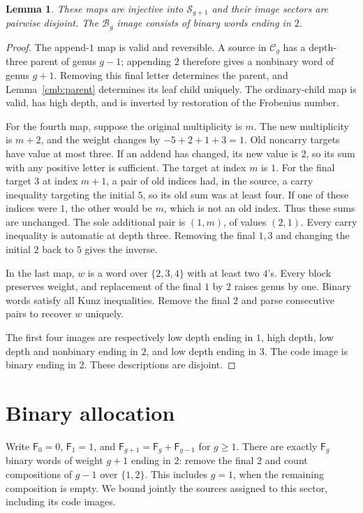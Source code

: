 \documentclass[11pt]{amsart}
\newtheorem{lemma}[theorem]{Lemma}
\theoremstyle{definition}
\theoremstyle{remark}
\newcommand{\Fib}{\mathsf F}
\numberwithin{equation}{section}
\begin{document}
\begin{lemma}\label{cmb:elementary-maps}
These maps are injective into $\mathcal S_{g+1}$ and their image sectors
are pairwise disjoint. The $\mathcal B_g$ image consists of binary words
ending in $2$.
\end{lemma}
\begin{proof}
The append-$1$ map is valid and reversible. A source in $\mathcal C_g$
has a depth-three parent of genus $g-1$; appending $2$ therefore gives a
nonbinary word of genus $g+1$. Removing this final letter determines the
parent, and Lemma~\ref{cmb:parent} determines its leaf child uniquely.
The ordinary-child map is valid, has high depth, and is inverted by
restoration of the Frobenius number.

For the fourth map, suppose the original multiplicity is $m$. The new
multiplicity is $m+2$, and the weight changes by $-5+2+1+3=1$.
Old noncarry targets have value at most three. If an addend has changed,
its new value is $2$, so its sum with any positive letter is sufficient.
The target at index $m$ is $1$. For the final target $3$ at index $m+1$,
a pair of old indices had, in the source, a carry inequality targeting the
initial $5$, so its old sum was at least four. If one of these indices were
$1$, the other would be $m$, which is not an old index. Thus these sums
are unchanged. The sole additional pair is $(1,m)$, of values $(2,1)$.
Every carry inequality is automatic at depth three. Removing the final
$1,3$ and changing the initial $2$ back to $5$ gives the inverse.

In the last map, $w$ is a word over $\{2,3,4\}$ with at least two $4$'s.
Every block preserves weight, and replacement of the final $1$ by $2$
raises genus by one. Binary words satisfy all Kunz inequalities. Remove
the final $2$ and parse consecutive pairs to recover $w$ uniquely.

The first four images are respectively low depth ending in $1$, high
depth, low depth and nonbinary ending in $2$, and low depth ending in $3$.
The code image is binary ending in $2$. These descriptions are disjoint.
\end{proof}

\section{Binary allocation}
\label{cmb:binary}
Write $\Fib_0=0$, $\Fib_1=1$, and
$\Fib_{g+1}=\Fib_g+\Fib_{g-1}$ for $g\ge1$.
There are exactly $\Fib_g$ binary words of weight $g+1$ ending in $2$:
remove the final $2$ and count compositions of $g-1$ over $\{1,2\}$.
This includes $g=1$, when the remaining composition is empty. We bound
jointly the sources assigned to this sector, including its code images.
\end{document}

